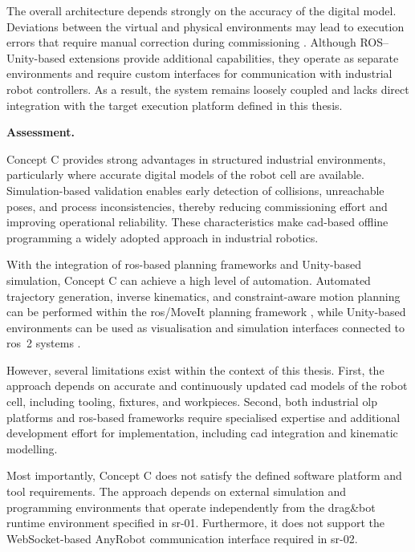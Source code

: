 The overall architecture depends strongly on the accuracy of the digital model. Deviations between the virtual and physical environments may lead to execution errors that require manual correction during commissioning \cite{Siciliano2016Robotics,Pan2012Survey}. Although ROS--Unity-based extensions provide additional capabilities, they operate as separate environments and require custom interfaces for communication with industrial robot controllers. As a result, the system remains loosely coupled and lacks direct integration with the target execution platform defined in this thesis.

\label{sec:concept-c-critical-evaluation}
\noindent\textbf{Assessment.}

Concept C provides strong advantages in structured industrial environments, particularly where accurate digital models of the robot cell are available. Simulation-based validation enables early detection of collisions, unreachable poses, and process inconsistencies, thereby reducing commissioning effort and improving operational reliability. These characteristics make \acs{cad}-based offline programming a widely adopted approach in industrial robotics.

With the integration of \acs{ros}-based planning frameworks and Unity-based simulation, Concept C can achieve a high level of automation. Automated trajectory generation, inverse kinematics, and constraint-aware motion planning can be performed within the \acs{ros}/MoveIt planning framework \cite{quigley2009ros,Coleman2014MoveIt}, while Unity-based environments can be used as visualisation and simulation interfaces connected to \acs{ros}~2 systems \cite{UnityROS2Docs}.

However, several limitations exist within the context of this thesis. First, the approach depends on accurate and continuously updated \acs{cad} models of the robot cell, including tooling, fixtures, and workpieces. Second, both industrial \acs{olp} platforms and \acs{ros}-based frameworks require specialised expertise and additional development effort for implementation, including \acs{cad} integration and kinematic modelling.

Most importantly, Concept C does not satisfy the defined software platform and tool requirements. The approach depends on external simulation and programming environments that operate independently from the drag\&bot runtime environment specified in \acs{sr}-01. Furthermore, it does not support the WebSocket-based AnyRobot communication interface required in \acs{sr}-02.

